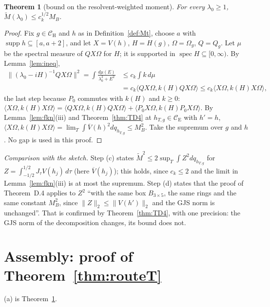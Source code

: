\documentclass[11pt,a4paper]{article}
\newcommand{\CE}{\mathcal{C}_{\mathrm E}}
\newcommand{\CH}{\mathcal{C}_{\mathrm H}}
\newcommand{\Om}{\Omega}
\newcommand{\ip}[2]{\langle #1,#2\rangle}
\DeclareMathOperator{\supp}{supp}
\DeclareMathOperator{\spec}{spec}
\newcommand{\Vb}{\overline V}                 %
\newcommand{\Mt}{\widetilde M}                %
\theoremstyle{plain}
\newtheorem{ttheorem}[tlemma]{Theorem}
\theoremstyle{definition}
\begin{document}
\begin{ttheorem}[bound on the resolvent-weighted moment]\label{thm:Mt}
For every $\lambda_0\ge1$, $\Mt(\lambda_0)\le c_k^{1/2}M_B$.
\end{ttheorem}

\begin{proof}
Fix $g\in\CH$ and $h$ as in Definition~\ref{def:Mt}, choose $a$ with $\supp h\subseteq[a,a+2]$,
and let $X=V(h)$, $H=H(g)$, $\Om=\Om_g$, $Q=Q_g$.  Let $\mu$ be the spectral measure of $QX\Om$
for $H$; it is supported in $\spec H\subseteq[0,\infty)$.  By Lemma~\ref{lem:ineq},
\begin{align*}
 \|(\lambda_0-iH)^{-1}QX\Om\|^2=\int\frac{d\mu(E)}{\lambda_0^2+E^2}&\le c_k\int k\,d\mu\\
 &=c_k\ip{QX\Om}{k(H)QX\Om}\le c_k\ip{X\Om}{k(H)X\Om},
\end{align*}
the last step because $P_0$ commutes with $k(H)$ and $k\ge0$:
$\ip{X\Om}{k(H)X\Om}=\ip{QX\Om}{k(H)QX\Om}+\ip{P_0X\Om}{k(H)P_0X\Om}$.  By
Lemma~\ref{lem:fkn}(iii) and Theorem~\ref{thm:TD4} at $h_{T,g}\in\CE$ with $h'=h$,
$\ip{X\Om}{k(H)X\Om}=\lim_T\int\Vb(h)^2dq_{h_{T,g}}\le M_B^2$.  Take the supremum over $g$ and
$h$.  No gap is used in this proof.
\end{proof}

\emph{Comparison with the sketch.}  Step (c) states $\Mt^2\le2\sup_T\int Z^2dq_{h_{T,g}}$ for
$Z=\int_{-1/2}^{1/2}J_\tau V(h_j)\,d\tau$ (here $\Vb(h_j)$); this holds, since $c_k\le2$ and the
limit in Lemma~\ref{lem:fkn}(iii) is at most the supremum.  Step (d) states that the proof of
Theorem~D.4 applies to $Z^2$ ``with the same box $B_{3\times5}$, the same rings and the same
constant $M_B^2$, since $\|Z\|_2\le\|V(h')\|_2$ and the GJS norm is unchanged''.  That is
confirmed by Theorem~\ref{thm:TD4}, with one precision: the GJS norm of the decomposition
changes, its bound does not.

\section{Assembly: proof of Theorem~\ref{thm:routeT}}\label{sec:assembly}

(a) is Theorem~\ref{thm:Mt}.
\end{document}

